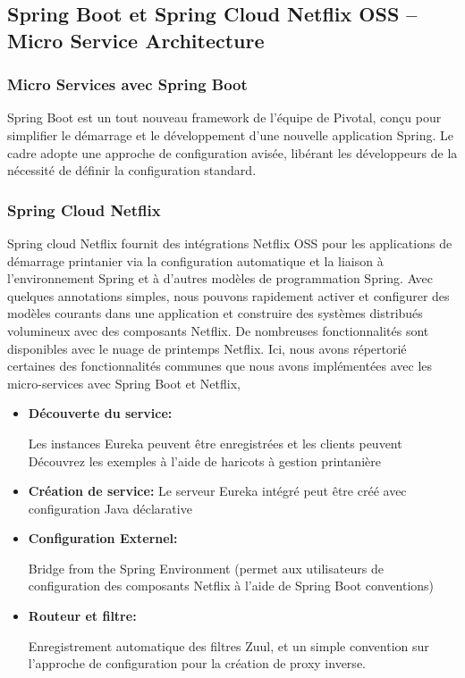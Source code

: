 \subsection{Spring Boot et Spring Cloud Netflix OSS – Micro Service Architecture}

\subsubsection{Micro Services avec Spring Boot}

 

Spring Boot est un tout nouveau framework de l'équipe de Pivotal, conçu pour simplifier le démarrage et le développement d'une nouvelle application Spring. Le cadre adopte une approche de configuration avisée, libérant les développeurs de la nécessité de définir la configuration standard.\cite{MicroServices}

\subsubsection{Spring Cloud Netflix}
 

Spring cloud Netflix fournit des intégrations Netflix OSS pour les applications de démarrage printanier via la configuration automatique et la liaison à l'environnement Spring et à d'autres modèles de programmation Spring. Avec quelques annotations simples, nous pouvons rapidement activer et configurer des modèles courants dans une application et construire des systèmes distribués volumineux avec des composants Netflix. De nombreuses fonctionnalités sont disponibles avec le nuage de printemps Netflix. Ici, nous avons répertorié certaines des fonctionnalités communes que nous avons implémentées avec les micro-services avec Spring Boot et Netflix,\cite{MicroServices}

\begin{itemize}
\item \textbf{Découverte du service:}
	
	Les instances Eureka peuvent être enregistrées et les clients peuvent
	Découvrez les exemples à l'aide de haricots à gestion printanière
	

\item \textbf{	Création de service:}	
	Le serveur Eureka intégré peut être créé avec
	configuration Java déclarative
	
\item \textbf{	Configuration Externel:}	
	
	Bridge from the Spring Environment (permet aux utilisateurs de
	configuration des composants Netflix à l'aide de Spring Boot
	conventions)
	
      \item \textbf{	Routeur et filtre:}	
	
	Enregistrement automatique des filtres Zuul, et un simple
	convention sur l'approche de configuration pour la création de proxy inverse.
\end{itemize}


